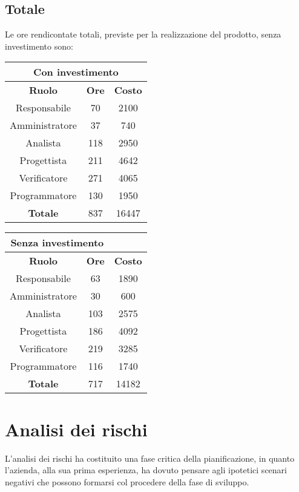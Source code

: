 \documentclass{scalatekids-article}
\begin{document}
\subsection{Totale}
Le ore rendicontate totali, previste per la realizzazione del prodotto, senza
investimento sono:
\begin{center}
  \normalsize
  \begin{tabular}{| c | c | c |}
    \hline
    \multicolumn{3}{|c|}{\textbf{Con investimento}}\\
    \hline
    \textbf{Ruolo} & \textbf{Ore} & \textbf{Costo}\\
    \hline
    Responsabile & 70 & 2100\\
    Amministratore & 37 & 740\\
    Analista & 118 & 2950\\
    Progettista & 211 & 4642\\
    Verificatore & 271 & 4065 \\
    Programmatore & 130 & 1950 \\
    \hline
    \textbf{Totale} & 837 & 16447\\
    \hline
  \end{tabular}
  \qquad
  \begin{tabular}{| c | c | c |}
    \hline
    \multicolumn{2}{|c|}{\textbf{Senza investimento}}\\
    \hline
    \textbf{Ruolo} & \textbf{Ore} & \textbf{Costo}\\
    \hline
    Responsabile & 63 & 1890\\
    Amministratore & 30 & 600\\
    Analista & 103 & 2575\\
    Progettista & 186 & 4092\\
    Verificatore & 219 & 3285\\
    Programmatore & 116 & 1740 \\
    \hline
    \textbf{Totale} & 717 & 14182 \\
    \hline
  \end{tabular}
\end{center}
\section{Analisi dei rischi}
L'analisi dei rischi ha costituito una fase critica della pianificazione, in
quanto l'azienda, alla sua prima esperienza, ha dovuto pensare agli ipotetici
scenari negativi che possono formarsi col procedere della fase di sviluppo.
\end{document}
